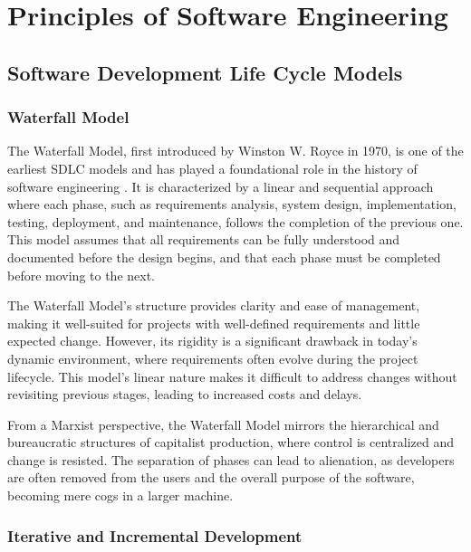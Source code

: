\chapter{Principles of Software Engineering}
\begin{refsection}

\section{Software Development Life Cycle Models}
\begin{multicols}{2}
{\small

\subsection{Waterfall Model}

The Waterfall Model, first introduced by Winston W. Royce in 1970, is one of the earliest SDLC models and has played a foundational role in the history of software engineering \cite[p. 1]{royce1970}. It is characterized by a linear and sequential approach where each phase, such as requirements analysis, system design, implementation, testing, deployment, and maintenance, follows the completion of the previous one. This model assumes that all requirements can be fully understood and documented before the design begins, and that each phase must be completed before moving to the next.

The Waterfall Model’s structure provides clarity and ease of management, making it well-suited for projects with well-defined requirements and little expected change. However, its rigidity is a significant drawback in today’s dynamic environment, where requirements often evolve during the project lifecycle. This model's linear nature makes it difficult to address changes without revisiting previous stages, leading to increased costs and delays.

From a Marxist perspective, the Waterfall Model mirrors the hierarchical and bureaucratic structures of capitalist production, where control is centralized and change is resisted. The separation of phases can lead to alienation, as developers are often removed from the users and the overall purpose of the software, becoming mere cogs in a larger machine.

\subsection{Iterative and Incremental Development}

}
\end{multicols}
\end{refsection}

